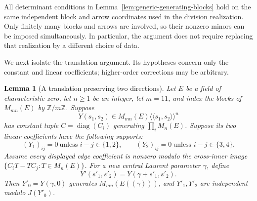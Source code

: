 \documentclass[11pt]{article}
\newtheorem{lemma}[theorem]{Lemma}
\theoremstyle{definition}
\theoremstyle{remark}
\numberwithin{equation}{section}
\begin{document}
All determinant conditions in Lemma~\ref{lem:generic-generating-blocks}
hold on the same independent block and arrow coordinates used in
the division realization.  Only finitely many blocks and arrows are
involved, so their nonzero minors can be imposed simultaneously.
In particular, the argument does not require replacing that realization
by a different choice of data.

We next isolate the translation argument.  Its hypotheses concern
only the constant and linear coefficients; higher-order corrections
may be arbitrary.

\begin{lemma}[A translation preserving two directions]
\label{lem:translation-two-directions}
Let $E$ be a field of characteristic zero, let $n\ge1$ be an integer,
let $m=11$, and index
the blocks of $M_{mn}(E)$ by $\mathbb Z/m\mathbb Z$.
Suppose
\[
 Y(s_1,s_2)\in M_{mn}(E)
       \langle\!\langle s_1,s_2\rangle\!\rangle^u
\]
has constant tuple $C=\operatorname{diag}(C_i)$ generating
$\prod_iM_n(E)$.  Suppose its two linear coefficients have the
following supports:
\[
 (Y_1)_{ij}=0\ \text{unless }i-j\in\{1,2\},
 \qquad
 (Y_2)_{ij}=0\ \text{unless }i-j\in\{3,4\}.
\]
Assume every displayed edge coefficient is nonzero modulo the
cross-inner image $\{C_iT-TC_j:T\in M_n(E)\}$.
For a new central Laurent parameter $\gamma$, define
\[
 Y'(s'_1,s'_2)=Y(\gamma+s'_1,s'_2).
\]
Then $Y'_0=Y(\gamma,0)$ generates $M_{mn}(E((\gamma)))$, and
$Y'_1,Y'_2$ are independent modulo $J(Y'_0)$.
\end{lemma}
\end{document}
